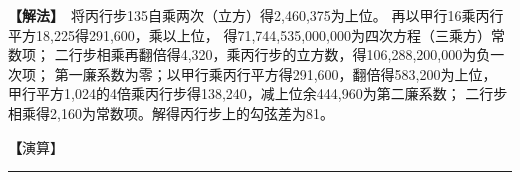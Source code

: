 \documentclass[11pt,a4paper]{article}
\let\origsquare\square
\renewcommand{\square}{\ensuremath{\origsquare}}%
\newcommand{\longline}{\noindent\rule{\textwidth}{0.4pt}}
\newcommand{\mdFAYUE}[1]{%
  \par\noindent\textcolor{methodcolor}{\textbf{【解法】}}\,{\modfont #1}\par\nopagebreak%
}
\newcommand{\mdTSAOYUE}[1]{%
  \par\noindent\textcolor{workcolor}{\textbf【演算】}}\,{\modfont #1}\par%
\begin{document}
\begin{paracol}{2}
\begin{rightcolumn}
\mdFAYUE{%
将丙行步135自乘两次（立方）得2,460,375为上位。
再以甲行16乘丙行平方18,225得291,600，乘以上位，
得71,744,535,000,000为四次方程（三乘方）常数项；
二行步相乘再翻倍得4,320，乘丙行步的立方数，得106,288,200,000为负一次项；
第一廉系数为零；以甲行乘丙行平方得291,600，翻倍得583,200为上位，
甲行平方1,024的4倍乘丙行步得138,240，减上位余444,960为第二廉系数；
二行步相乘得2,160为常数项。解得丙行步上的勾弦差为81。}

\mdTSAOYUE{%
辨识两数相加得151。从皇极弦中减去，余138即虚勾与虚股之和。
若两数相减，余119为高弦减平弦，又为皇极弦减去小差弦，
又为大差弦减去皇极弦。设天元一为丙行的大差数。
取丙行步135，自乘得$\square$，除以天元，得$\square$为勾弦和。
减去天元得$\square$为两倍丙勾。再用丙南行乘之，得$\square$为两倍积。
再除以天元，得$\square$为丙勾外容圆半（泛寄）。
另取丙南行用两倍甲勾乘之，得$\square$太，应除以两倍丙勾。不除，
便以此作为甲股（内寄两倍丙勾为分母）。再用两倍甲勾32乘之，得$\square$太为两个甲直积。
再取丙南行减去天元，得$\square$为黄方，自乘得$\square$为丙上勾弦差乘股弦差两段，
除以天元得$\square$为两个丙小差。用甲股乘之，得下式$\square$。
再用丙南行除之，得$\square$，折半得下式$\square$为一个甲步股弦差，
内亦带前两倍丙勾分母。再置两个甲直积，内已寄此甲股弦差分母，便为甲步股外容圆半（寄左）。
再置先求到的泛寄，用甲股弦差分母乘之，得$\square$为同数，
与左式相消得下式$\square$。开四次方（三乘方）得81步，即丙步上勾弦差。
《钤经》载此法：以勾弦差率平方减丙行平方，再以丙行乘之为被除数，以差率平方为除数，依法得直径。
此法是以勾外求圆半。应以大差除倍积，而今皆以大差平方为分母。
依法求之：勾弦差81自乘得6,561，减丙行平方18,225，
余11,664，再以丙行135乘之，得157,464,000为实，
以大差平方6,561为法，依法得240步，即城径。}
\end{rightcolumn}

\end{paracol}

\vspace{0.3cm}
\begin{center}\longline\end{center}
\end{document}
